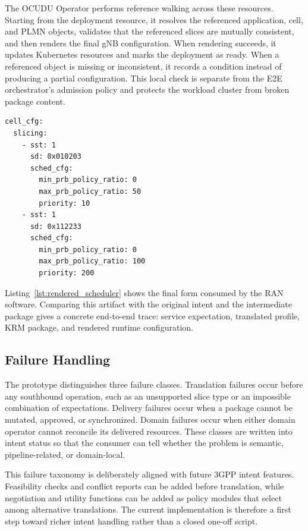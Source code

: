 The OCUDU Operator performs reference walking across these resources. Starting from the deployment resource, it resolves the referenced application, cell, and PLMN objects, validates that the referenced slices are mutually consistent, and then renders the final gNB configuration. When rendering succeeds, it updates Kubernetes resources and marks the deployment as ready. When a referenced object is missing or inconsistent, it records a condition instead of producing a partial configuration. This local check is separate from the E2E orchestrator's admission policy and protects the workload cluster from broken package content.

\begin{lstlisting}[caption={Representative rendered scheduler fragment}, label={lst:rendered_scheduler}]
cell_cfg:
  slicing:
    - sst: 1
      sd: 0x010203
      sched_cfg:
        min_prb_policy_ratio: 0
        max_prb_policy_ratio: 50
        priority: 10
    - sst: 1
      sd: 0x112233
      sched_cfg:
        min_prb_policy_ratio: 0
        max_prb_policy_ratio: 100
        priority: 200
\end{lstlisting}

Listing~\ref{lst:rendered_scheduler} shows the final form consumed by the RAN software. Comparing this artifact with the original intent and the intermediate package gives a concrete end-to-end trace: service expectation, translated profile, KRM package, and rendered runtime configuration.

\subsection{Failure Handling}

The prototype distinguishes three failure classes. Translation failures occur before any southbound operation, such as an unsupported slice type or an impossible combination of expectations. Delivery failures occur when a package cannot be mutated, approved, or synchronized. Domain failures occur when either domain operator cannot reconcile its delivered resources. These classes are written into intent status so that the consumer can tell whether the problem is semantic, pipeline-related, or domain-local.

This failure taxonomy is deliberately aligned with future 3GPP intent features. Feasibility checks and conflict reports can be added before translation, while negotiation and utility functions can be added as policy modules that select among alternative translations. The current implementation is therefore a first step toward richer intent handling rather than a closed one-off script.
